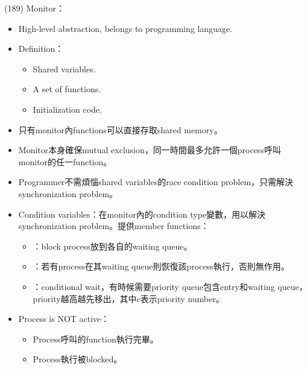 \begin{theorem}{(189)} Monitor：\begin{itemize}
        \item High-level abstraction, belongs to programming language.
        \item Definition：\begin{itemize}
            \item Shared variables.
            \item A set of functions.
            \item Initialization code.
        \end{itemize} 
        \item 只有monitor內functions可以直接存取shared memory。
        \item Monitor本身確保mutual exclusion，同一時間最多允許一個process呼叫monitor的任一function。
        \item Programmer不需煩惱shared variables的race condition problem，只需解決synchronization problem。
        \item Condition variables：在monitor內的condition type變數，用以解決synchronization problem。提供member functions：\begin{itemize}
            \item {}：block process放到各自的waiting queue。
            \item {}：若有process在其waiting queue則恢復該process執行，否則無作用。
            \item {}：conditional wait，有時候需要priority queue包含entry和waiting queue，priority越高越先移出，其中$c$表示priority number。
        \end{itemize}
        \item Process is NOT active：\begin{itemize}
            \item Process呼叫的function執行完畢。
            \item Process執行被blocked。
        \end{itemize}
    \end{itemize}
\end{theorem}

